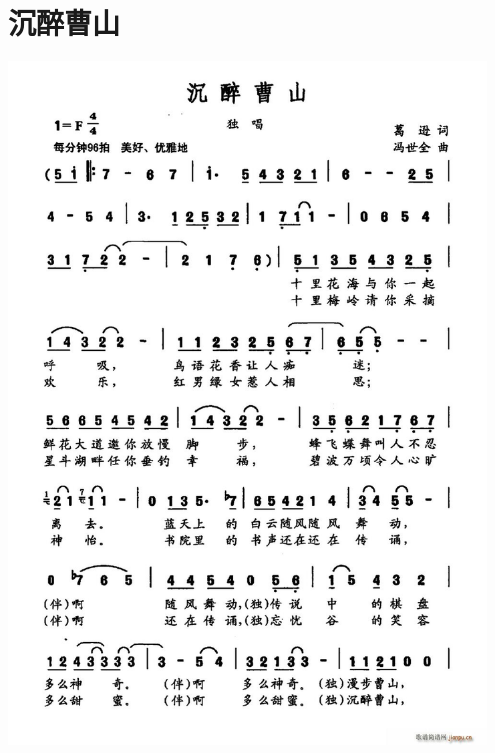 \documentclass[cn,pad,twocol]{elegantbook}
\begin{document}
\section{沉醉曹山}  \includegraphics[width=0.95\textwidth]{dongxiao/20200808-沉醉曹山.jpg}
\end{document}
